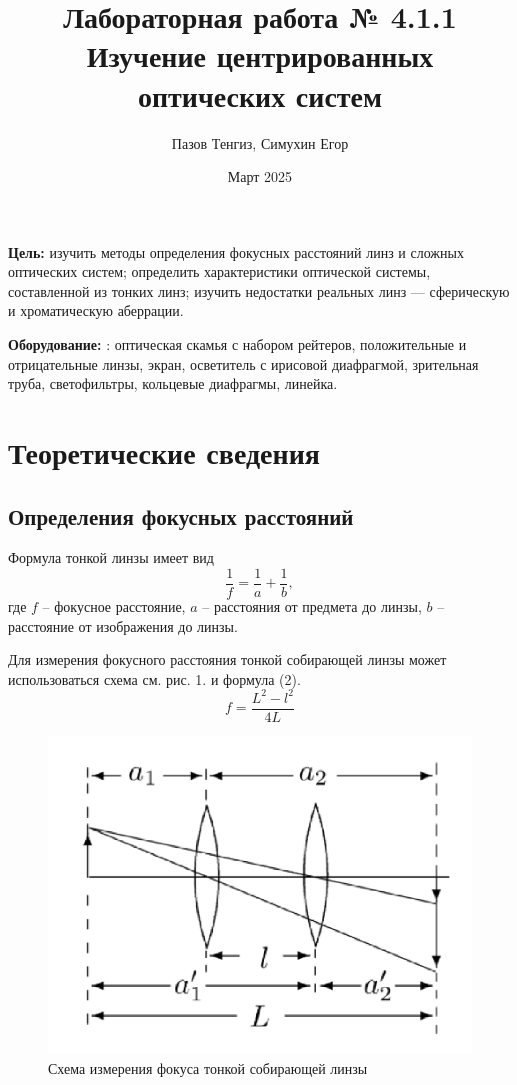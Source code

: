 \documentclass[a4paper,12pt]{article}
\title{Лабораторная работа № 4.1.1\\Изучение центрированных оптических систем}
\author{Пазов Тенгиз, Симухин Егор}
\date{Март 2025}
\begin{document}
\maketitle
\newpage

\textbf{Цель:} изучить методы определения фокусных расстояний
линз и сложных оптических систем; определить характеристики оптической системы, составленной из тонких линз; изучить недостатки
реальных линз — сферическую и хроматическую аберрации.

\textbf{Оборудование:} : оптическая скамья с набором рейтеров, положительные и отрицательные линзы, экран, осветитель с ирисовой
диафрагмой, зрительная труба, светофильтры, кольцевые диафрагмы, линейка.

\section{Теоретические сведения}
\subsection*{Определения фокусных расстояний}
Формула тонкой линзы имеет вид
\begin{equation}
    \frac{1}{f} = \frac{1}{a} + \frac{1}{b},
\end{equation}
\noindent
где $f$ -- фокусное расстояние, $a$ -- расстояния от предмета до линзы, $b$ -- расстояние от изображения до линзы.

\noindent
Для измерения фокусного расстояния тонкой собирающей линзы может использоваться схема см. рис. 1. и формула (2).
\begin{equation}
    f = \frac{L^2 - l^2}{4L}
\end{equation}

\begin{figure}[H]
    \centering
    \includegraphics[scale=0.7]{1.png}
    \caption{Схема измерения фокуса тонкой собирающей линзы}
\end{figure}
\end{document}
